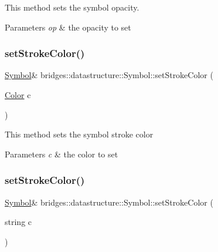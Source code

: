 This method sets the symbol opacity. 


\begin{DoxyParams}{Parameters}
{\em op} & the opacity to set \\
\hline
\end{DoxyParams}
\mbox{\label{classbridges_1_1datastructure_1_1_symbol_a07b5f56354740a4c8d2b53aef638e4e6}} 
\subsubsection{\texorpdfstring{set\+Stroke\+Color()}{setStrokeColor()}\hspace{0.1cm}{\footnotesize\ttfamily [1/2]}}
{\footnotesize\ttfamily \hyperlink{classbridges_1_1datastructure_1_1_symbol}{Symbol}\& bridges\+::datastructure\+::\+Symbol\+::set\+Stroke\+Color (\begin{DoxyParamCaption}\item[{\hyperlink{classbridges_1_1datastructure_1_1_color}{Color}}]{c }\end{DoxyParamCaption})\hspace{0.3cm}{\ttfamily [inline]}}

This method sets the symbol stroke color


\begin{DoxyParams}{Parameters}
{\em c} & the color to set \\
\hline
\end{DoxyParams}
\mbox{\label{classbridges_1_1datastructure_1_1_symbol_a6df1acb340b625fc5d480daaf220075d}} 
\subsubsection{\texorpdfstring{set\+Stroke\+Color()}{setStrokeColor()}\hspace{0.1cm}{\footnotesize\ttfamily [2/2]}}
{\footnotesize\ttfamily \hyperlink{classbridges_1_1datastructure_1_1_symbol}{Symbol}\& bridges\+::datastructure\+::\+Symbol\+::set\+Stroke\+Color (\begin{DoxyParamCaption}\item[{string}]{c }\end{DoxyParamCaption})\hspace{0.3cm}{\ttfamily [inline]}}



